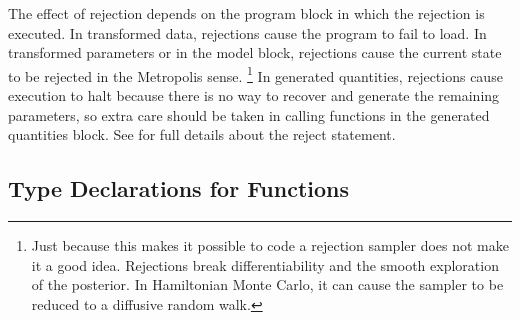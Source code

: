 The effect of rejection depends on the program block in which the
rejection is executed.  In transformed data, rejections cause the
program to fail to load.  In transformed parameters or in the model
block, rejections cause the current state to be rejected in the
Metropolis sense.%
%
\footnote{Just because this makes it possible to code a rejection
  sampler does not make it a good idea.  Rejections break
  differentiability and the smooth exploration of the posterior.  In
  Hamiltonian Monte Carlo, it can cause the sampler to be reduced to a
  diffusive random walk.}
%
In generated quantities, rejections cause execution to halt because
there is no way to recover and generate the remaining parameters, so
extra care should be taken in calling functions in the generated
quantities block.  See  for full
details about the reject statement.

\subsection{Type Declarations for Functions}

